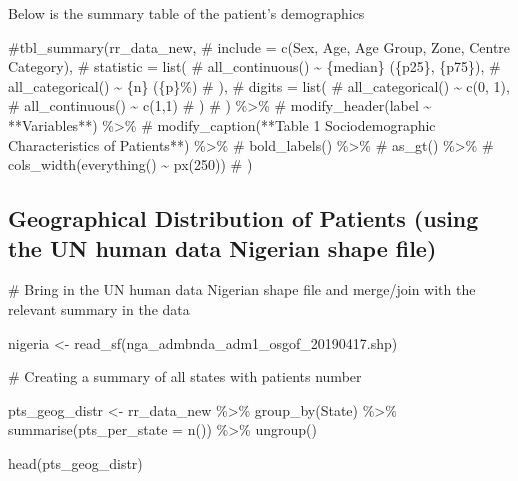 \documentclass[
  letterpaper,
  DIV=11,
  numbers=noendperiod]{scrartcl}
\newenvironment{Shaded}{\begin{snugshade}}{\end{snugshade}}
\newcommand{\AttributeTok}[1]{\textcolor[rgb]{0.40,0.45,0.13}{#1}}
\newcommand{\CommentTok}[1]{\textcolor[rgb]{0.37,0.37,0.37}{#1}}
\newcommand{\FunctionTok}[1]{\textcolor[rgb]{0.28,0.35,0.67}{#1}}
\newcommand{\NormalTok}[1]{\textcolor[rgb]{0.00,0.23,0.31}{#1}}
\newcommand{\OtherTok}[1]{\textcolor[rgb]{0.00,0.23,0.31}{#1}}
\newcommand{\SpecialCharTok}[1]{\textcolor[rgb]{0.37,0.37,0.37}{#1}}
\newcommand{\StringTok}[1]{\textcolor[rgb]{0.13,0.47,0.30}{#1}}
\begin{document}
Below is the summary table of the patient's demographics

\begin{Shaded}
\begin{Highlighting}[]
\CommentTok{\#tbl\_summary(rr\_data\_new,}
\CommentTok{\# include = c(Sex, Age, \textasciigrave{}Age Group\textasciigrave{}, Zone, \textasciigrave{}Centre Category\textasciigrave{}),}
\CommentTok{\#  statistic = list(}
\CommentTok{\#    all\_continuous() \textasciitilde{} \textquotesingle{}\{median\} (\{p25\}, \{p75\})\textquotesingle{},}
\CommentTok{\#    all\_categorical() \textasciitilde{} \textquotesingle{}\{n\} (\{p\}\%)\textquotesingle{}}
\CommentTok{\#  ),}
\CommentTok{\#  digits = list(}
\CommentTok{\#    all\_categorical() \textasciitilde{} c(0, 1),}
\CommentTok{\#    all\_continuous() \textasciitilde{} c(1,1)}
\CommentTok{\#  )}
\CommentTok{\#  ) \%\textgreater{}\% }
\CommentTok{\#  modify\_header(label \textasciitilde{} \textquotesingle{}**Variables**\textquotesingle{}) \%\textgreater{}\% }
\CommentTok{\#  modify\_caption(\textquotesingle{}**Table 1 Sociodemographic Characteristics of Patients**\textquotesingle{}) \%\textgreater{}\% }
\CommentTok{\#  bold\_labels() \%\textgreater{}\% }
\CommentTok{\#  as\_gt() \%\textgreater{}\% }
\CommentTok{\#  cols\_width(everything() \textasciitilde{} px(250))}
\CommentTok{\#  )}
\end{Highlighting}
\end{Shaded}

\subsection{Geographical Distribution of Patients (using the UN human
data Nigerian shape
file)}\label{geographical-distribution-of-patients-using-the-un-human-data-nigerian-shape-file}

\begin{Shaded}
\begin{Highlighting}[]
\CommentTok{\# Bring in the UN human data Nigerian shape file and merge/join with the relevant summary in the data}

\NormalTok{nigeria }\OtherTok{\textless{}{-}} \FunctionTok{read\_sf}\NormalTok{(}\StringTok{\textquotesingle{}nga\_admbnda\_adm1\_osgof\_20190417.shp\textquotesingle{}}\NormalTok{)}

\CommentTok{\# Creating a summary of all states with patient\textquotesingle{}s number}

\NormalTok{pts\_geog\_distr }\OtherTok{\textless{}{-}}\NormalTok{ rr\_data\_new }\SpecialCharTok{\%\textgreater{}\%} 
  \FunctionTok{group\_by}\NormalTok{(State) }\SpecialCharTok{\%\textgreater{}\%} 
  \FunctionTok{summarise}\NormalTok{(}\AttributeTok{pts\_per\_state =} \FunctionTok{n}\NormalTok{()) }\SpecialCharTok{\%\textgreater{}\%} 
  \FunctionTok{ungroup}\NormalTok{()}

\FunctionTok{head}\NormalTok{(pts\_geog\_distr)}
\end{Highlighting}
\end{Shaded}
\end{document}
